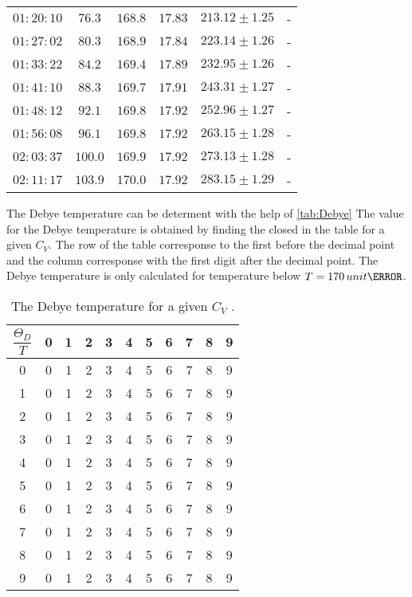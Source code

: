 \begin{table}[H]
\begin{tabular}{c c c c c c}
          $01:20:10$  &  $76.3$ &    $168.8$ &   $ 17.83$  & $213.12 \pm 1.25$&-                       \\    
          $01:27:02$  &  $80.3$ &    $168.9$ &   $ 17.84$  & $223.14 \pm 1.26$&-                       \\    
          $01:33:22$  &  $84.2$ &    $169.4$ &   $ 17.89$  & $232.95 \pm 1.26$&-                       \\    
          $01:41:10$  &  $88.3$ &    $169.7$ &   $ 17.91$  & $243.31 \pm 1.27$&-                       \\    
          $01:48:12$  &  $92.1$ &    $169.8$ &   $ 17.92$  & $252.96 \pm 1.27$&-                       \\    
          $01:56:08$  &  $96.1$ &    $169.8$ &   $ 17.92$  & $263.15 \pm 1.28$&-                       \\    
          $02:03:37$  &  $100.0$&    $169.9$ &   $ 17.92$  & $273.13 \pm 1.28$&-                       \\   
          $02:11:17$  &  $103.9$&    $170.0$ &   $ 17.92$  & $283.15 \pm 1.29$&-                       \\   
    \bottomrule
    \end{tabular}
    \end{table}


The Debye temperature can be determent with the help of \autoref{tab:Debye}
The value for the Debye temperature is obtained by finding the closed in the table for a given $C_V$.
The row of the table corresponse to the first before the decimal point and the column corresponse
with the first digit after the decimal point. 
The Debye temperature is only calculated for temperature below $T = 170 \, unit{\kelvin}$.

\begin{table}[H]
\centering
\caption{The Debye temperature for a given $C_V$  \cite{v47}.}
\label{tab:Debye}
\begin{tabular}{c | c c c c c c c c c c}
\toprule
 $\dfrac{\Theta_D}{T} $ &0 & 1 & 2 &3 & 4 & 5&6 & 7 & 8 &9\\
\midrule
    0 & 0 & 1 & 2 & 3 & 4 & 5 & 6 & 7 & 8 & 9 \\
    1 & 0 & 1 & 2 & 3 & 4 & 5 & 6 & 7 & 8 & 9 \\
    2 & 0 & 1 & 2 & 3 & 4 & 5 & 6 & 7 & 8 & 9 \\
    3 & 0 & 1 & 2 & 3 & 4 & 5 & 6 & 7 & 8 & 9 \\
    4 & 0 & 1 & 2 & 3 & 4 & 5 & 6 & 7 & 8 & 9 \\
    5 & 0 & 1 & 2 & 3 & 4 & 5 & 6 & 7 & 8 & 9 \\
    6 & 0 & 1 & 2 & 3 & 4 & 5 & 6 & 7 & 8 & 9 \\
    7 & 0 & 1 & 2 & 3 & 4 & 5 & 6 & 7 & 8 & 9 \\
    8 & 0 & 1 & 2 & 3 & 4 & 5 & 6 & 7 & 8 & 9 \\
    9 & 0 & 1 & 2 & 3 & 4 & 5 & 6 & 7 & 8 & 9 \\
\bottomrule
\end{tabular}
\end{table}
